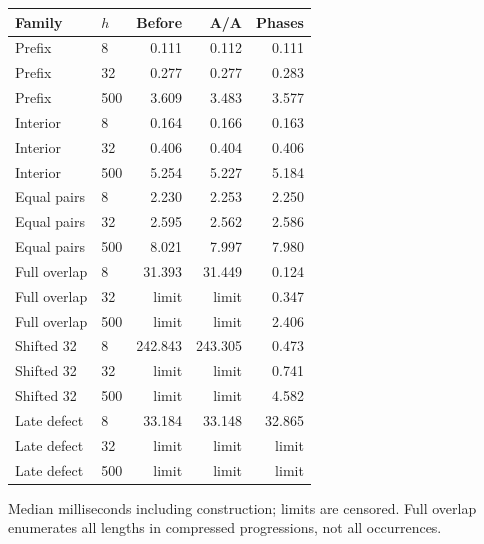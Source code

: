 \begin{center}\small
\begin{tabular}{@{}llrrr@{}}
\toprule
Family & $h$ & Before & A/A & Phases \\
\midrule
Prefix & 8 & 0.111 & 0.112 & 0.111 \\
Prefix & 32 & 0.277 & 0.277 & 0.283 \\
Prefix & 500 & 3.609 & 3.483 & 3.577 \\
Interior & 8 & 0.164 & 0.166 & 0.163 \\
Interior & 32 & 0.406 & 0.404 & 0.406 \\
Interior & 500 & 5.254 & 5.227 & 5.184 \\
Equal pairs & 8 & 2.230 & 2.253 & 2.250 \\
Equal pairs & 32 & 2.595 & 2.562 & 2.586 \\
Equal pairs & 500 & 8.021 & 7.997 & 7.980 \\
Full overlap & 8 & 31.393 & 31.449 & 0.124 \\
Full overlap & 32 & limit & limit & 0.347 \\
Full overlap & 500 & limit & limit & 2.406 \\
Shifted 32 & 8 & 242.843 & 243.305 & 0.473 \\
Shifted 32 & 32 & limit & limit & 0.741 \\
Shifted 32 & 500 & limit & limit & 4.582 \\
Late defect & 8 & 33.184 & 33.148 & 32.865 \\
Late defect & 32 & limit & limit & limit \\
Late defect & 500 & limit & limit & limit \\
\bottomrule
\end{tabular}
\end{center}
Median milliseconds including construction; limits are censored. Full overlap enumerates all lengths in compressed progressions, not all occurrences.
